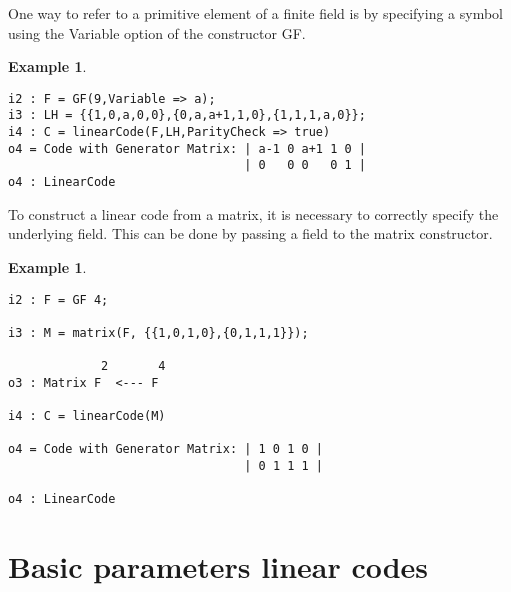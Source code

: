 \documentclass[12pt]{amsart}
\theoremstyle{plain}
\newtheorem{example}[theorem]{Example}
\begin{document}
One way to refer to a primitive element of a finite field is by specifying a symbol using the Variable option of the constructor GF.

\begin{example}
$\,$
\begin{verbatim}
i2 : F = GF(9,Variable => a);
i3 : LH = {{1,0,a,0,0},{0,a,a+1,1,0},{1,1,1,a,0}};
i4 : C = linearCode(F,LH,ParityCheck => true)
o4 = Code with Generator Matrix: | a-1 0 a+1 1 0 |
                                 | 0   0 0   0 1 |
o4 : LinearCode
\end{verbatim}
\end{example}
To construct a linear code from a matrix, it is necessary to correctly specify the underlying field. This can be done by passing a field to the matrix constructor.
\begin{example}
$\,$
\begin{verbatim}
i2 : F = GF 4;

i3 : M = matrix(F, {{1,0,1,0},{0,1,1,1}});

             2       4
o3 : Matrix F  <--- F

i4 : C = linearCode(M)

o4 = Code with Generator Matrix: | 1 0 1 0 |
                                 | 0 1 1 1 |

o4 : LinearCode

\end{verbatim}
\end{example}

\section{Basic parameters linear codes}~\label{pro}
\end{document}
